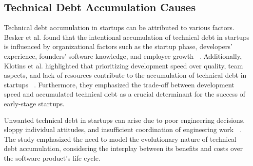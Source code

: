 \documentclass[manuscript]{acmart}
\begin{document}

\subsection{Technical Debt Accumulation Causes}
Technical debt accumulation in startups can be attributed to various factors. Besker et al. found that the intentional accumulation of technical debt in startups is influenced by organizational factors such as the startup phase, developers' experience, founders' software knowledge, and employee growth ~\cite{Besker2018}. Additionally, Klotins et al. highlighted that prioritizing development speed over quality, team aspects, and lack of resources contribute to the accumulation of technical debt in startups ~\cite{Klotins:2018:ETD}. Furthermore, they emphasized the trade-off between development speed and accumulated technical debt as a crucial determinant for the success of early-stage startups.

Unwanted technical debt in startups can arise due to poor engineering decisions, sloppy individual attitudes, and insufficient coordination of engineering work ~\cite{Klotins882019}. The study emphasized the need to model the evolutionary nature of technical debt accumulation, considering the interplay between its benefits and costs over the software product's life cycle.
\end{document}
